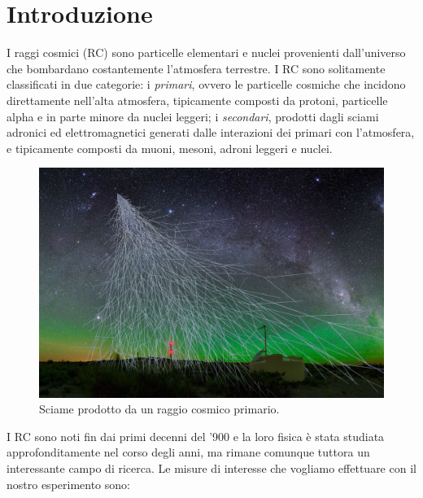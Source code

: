 \section{Introduzione}
I raggi cosmici (RC) sono particelle elementari e nuclei  provenienti dall'universo che bombardano costantemente l'atmosfera terrestre. I RC sono solitamente classificati in due categorie: i \emph{primari}, ovvero le particelle cosmiche che incidono direttamente nell'alta atmosfera, tipicamente composti da protoni, particelle alpha e in parte minore da nuclei leggeri; i \emph{secondari}, prodotti dagli sciami adronici ed elettromagnetici generati dalle interazioni dei primari con l'atmosfera, e tipicamente composti da muoni, mesoni, adroni leggeri e nuclei.
\begin{figure}[h!]
\centering
\includegraphics[width=0.9\linewidth]{pierre4HR.0.jpg}
\caption{Sciame prodotto da un raggio cosmico primario. }
\label{fig:sciami}
\end{figure}
 I RC sono noti fin dai primi decenni del '900 e la loro fisica è stata studiata approfonditamente nel corso degli anni, ma rimane comunque tuttora un interessante campo di ricerca. Le misure di interesse che vogliamo effettuare con il nostro esperimento sono: 
